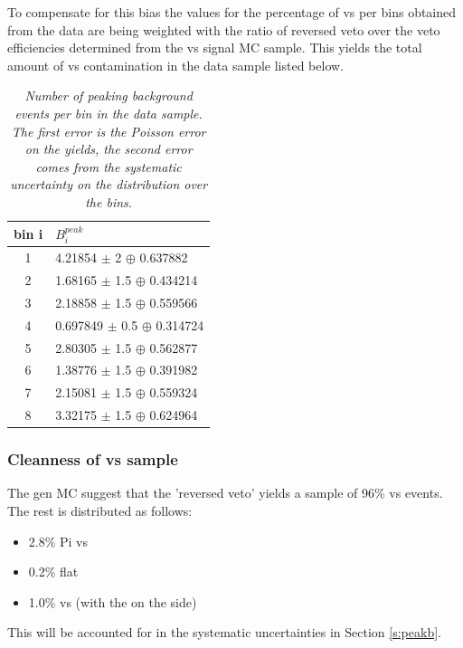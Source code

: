To compensate for this bias the values for the percentage of \KsPiPi vs \KsPiPi per bins obtained from the data are being weighted with the ratio of reversed \KS veto over the \KS veto efficiencies determined from the \KsPiPi vs \KsPiPi signal MC sample. This yields the total amount of \KsPiPi vs \KsPiPi contamination in the data sample listed below.
\begin{table}[!h]
	\begin{center}
		\begin{tabular}{c| l}
			bin i & $B^{peak}_i$  \\
			\hline 
			\hline
1 & 4.21854 $\pm$ 2 $\oplus$ 0.637882 \\ 
2 & 1.68165 $\pm$ 1.5 $\oplus$ 0.434214 \\ 
3 & 2.18858 $\pm$ 1.5 $\oplus$ 0.559566 \\ 
4 & 0.697849 $\pm$ 0.5 $\oplus$ 0.314724 \\ 
5 & 2.80305 $\pm$ 1.5 $\oplus$ 0.562877 \\ 
6 & 1.38776 $\pm$ 1.5 $\oplus$ 0.391982 \\ 
7 & 2.15081 $\pm$ 1.5 $\oplus$ 0.559324 \\ 
8 & 3.32175 $\pm$ 1.5 $\oplus$ 0.624964 \\
	\end{tabular}
	\end{center}
	\caption{\textit{Number of peaking background events per bin in the data sample. The first error is the Poisson error on the yields, the second error comes from the systematic uncertainty on the distribution over the bins.}}
	\vspace*{1cm}
\end{table}


\subsubsection{Cleanness of \KsPiPi vs \KsPiPi sample}
\label{sec:clean}
The gen MC suggest that the 'reversed \KS veto' yields a sample of 96\% \KsPiPi vs \KsPiPi events. The rest is distributed as follows:
\begin{itemize}
\item 2.8\% \4Pi vs \KsPiPi 
\item 0.2\% flat				
\item 1.0\% \KsPiPi vs \KsKs (with the \KsKs on the \KsPiPi side)
\end{itemize}
This will be accounted for in the systematic uncertainties in Section \ref{s:peakb}.\\

